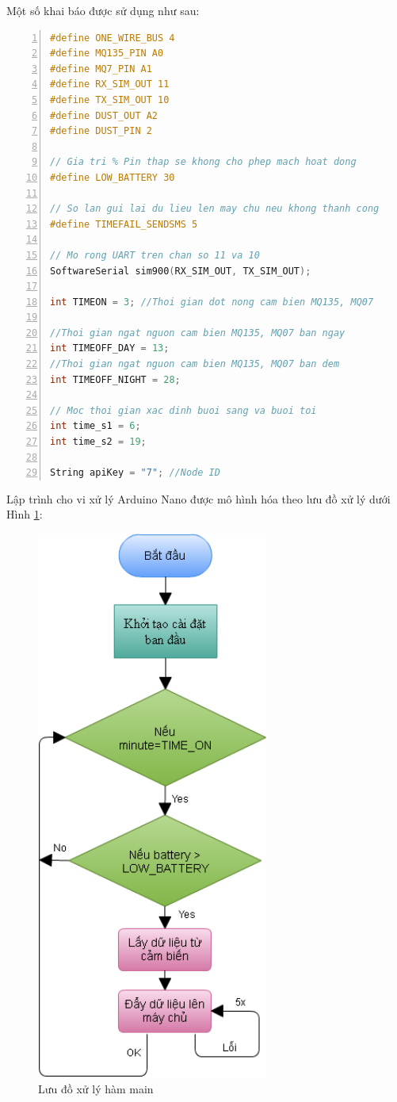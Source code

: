 Một số khai báo được sử dụng như sau:
\begin{lstlisting}[numbers=left,firstnumber=1,language=C]
#define ONE_WIRE_BUS 4
#define MQ135_PIN A0
#define MQ7_PIN A1
#define RX_SIM_OUT 11
#define TX_SIM_OUT 10
#define DUST_OUT A2
#define DUST_PIN 2

// Gia tri % Pin thap se khong cho phep mach hoat dong
#define LOW_BATTERY 30 

// So lan gui lai du lieu len may chu neu khong thanh cong
#define TIMEFAIL_SENDSMS 5 

// Mo rong UART tren chan so 11 va 10
SoftwareSerial sim900(RX_SIM_OUT, TX_SIM_OUT);

int TIMEON = 3; //Thoi gian dot nong cam bien MQ135, MQ07

//Thoi gian ngat nguon cam bien MQ135, MQ07 ban ngay
int TIMEOFF_DAY = 13; 
//Thoi gian ngat nguon cam bien MQ135, MQ07 ban dem
int TIMEOFF_NIGHT = 28;

// Moc thoi gian xac dinh buoi sang va buoi toi
int time_s1 = 6;
int time_s2 = 19;

String apiKey = "7"; //Node ID
\end{lstlisting}
Lập trình cho vi xử lý Arduino Nano được mô hình hóa theo lưu đồ xử lý dưới Hình \ref{fig:node_status}:

\begin{figure}[H]
	\centering    
	\includegraphics[width=3in]{node_status}
	\caption[Lưu đồ xử lý hàm main]{Lưu đồ xử lý hàm main}
	\label{fig:node_status}
\end{figure}

